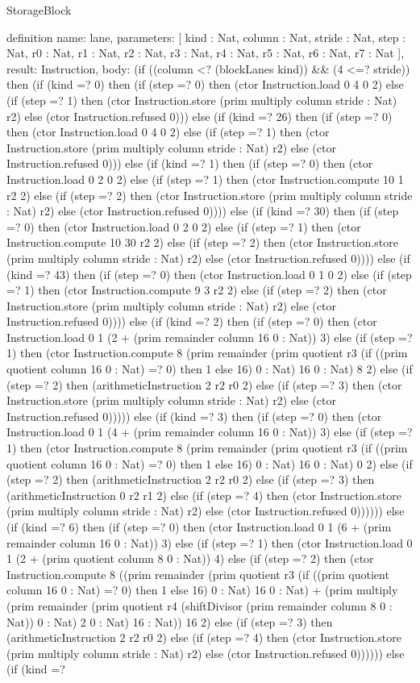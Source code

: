 \begin{lexlean}{StorageBlock}
\begin{semanticmodule}
definition{
  name: lane,
  parameters: [
    kind : Nat,
    column : Nat,
    stride : Nat,
    step : Nat,
    r0 : Nat,
    r1 : Nat,
    r2 : Nat,
    r3 : Nat,
    r4 : Nat,
    r5 : Nat,
    r6 : Nat,
    r7 : Nat
  ],
  result: Instruction,
  body: (if ((column <? (blockLanes kind)) && (4 <=? stride)) then (if (kind =? 0) then (if (step =? 0) then (ctor Instruction.load 0 4 0 2) else (if (step =? 1) then (ctor Instruction.store (prim multiply column stride : Nat) r2) else (ctor Instruction.refused 0))) else (if (kind =? 26) then (if (step =? 0) then (ctor Instruction.load 0 4 0 2) else (if (step =? 1) then (ctor Instruction.store (prim multiply column stride : Nat) r2) else (ctor Instruction.refused 0))) else (if (kind =? 1) then (if (step =? 0) then (ctor Instruction.load 0 2 0 2) else (if (step =? 1) then (ctor Instruction.compute 10 1 r2 2) else (if (step =? 2) then (ctor Instruction.store (prim multiply column stride : Nat) r2) else (ctor Instruction.refused 0)))) else (if (kind =? 30) then (if (step =? 0) then (ctor Instruction.load 0 2 0 2) else (if (step =? 1) then (ctor Instruction.compute 10 30 r2 2) else (if (step =? 2) then (ctor Instruction.store (prim multiply column stride : Nat) r2) else (ctor Instruction.refused 0)))) else (if (kind =? 43) then (if (step =? 0) then (ctor Instruction.load 0 1 0 2) else (if (step =? 1) then (ctor Instruction.compute 9 3 r2 2) else (if (step =? 2) then (ctor Instruction.store (prim multiply column stride : Nat) r2) else (ctor Instruction.refused 0)))) else (if (kind =? 2) then (if (step =? 0) then (ctor Instruction.load 0 1 (2 + (prim remainder column 16 0 : Nat)) 3) else (if (step =? 1) then (ctor Instruction.compute 8 (prim remainder (prim quotient r3 (if ((prim quotient column 16 0 : Nat) =? 0) then 1 else 16) 0 : Nat) 16 0 : Nat) 8 2) else (if (step =? 2) then (arithmeticInstruction 2 r2 r0 2) else (if (step =? 3) then (ctor Instruction.store (prim multiply column stride : Nat) r2) else (ctor Instruction.refused 0))))) else (if (kind =? 3) then (if (step =? 0) then (ctor Instruction.load 0 1 (4 + (prim remainder column 16 0 : Nat)) 3) else (if (step =? 1) then (ctor Instruction.compute 8 (prim remainder (prim quotient r3 (if ((prim quotient column 16 0 : Nat) =? 0) then 1 else 16) 0 : Nat) 16 0 : Nat) 0 2) else (if (step =? 2) then (arithmeticInstruction 2 r2 r0 2) else (if (step =? 3) then (arithmeticInstruction 0 r2 r1 2) else (if (step =? 4) then (ctor Instruction.store (prim multiply column stride : Nat) r2) else (ctor Instruction.refused 0)))))) else (if (kind =? 6) then (if (step =? 0) then (ctor Instruction.load 0 1 (6 + (prim remainder column 16 0 : Nat)) 3) else (if (step =? 1) then (ctor Instruction.load 0 1 (2 + (prim quotient column 8 0 : Nat)) 4) else (if (step =? 2) then (ctor Instruction.compute 8 ((prim remainder (prim quotient r3 (if ((prim quotient column 16 0 : Nat) =? 0) then 1 else 16) 0 : Nat) 16 0 : Nat) + (prim multiply (prim remainder (prim quotient r4 (shiftDivisor (prim remainder column 8 0 : Nat)) 0 : Nat) 2 0 : Nat) 16 : Nat)) 16 2) else (if (step =? 3) then (arithmeticInstruction 2 r2 r0 2) else (if (step =? 4) then (ctor Instruction.store (prim multiply column stride : Nat) r2) else (ctor Instruction.refused 0)))))) else (if (kind =? }
\end{semanticmodule}
\end{lexlean}
